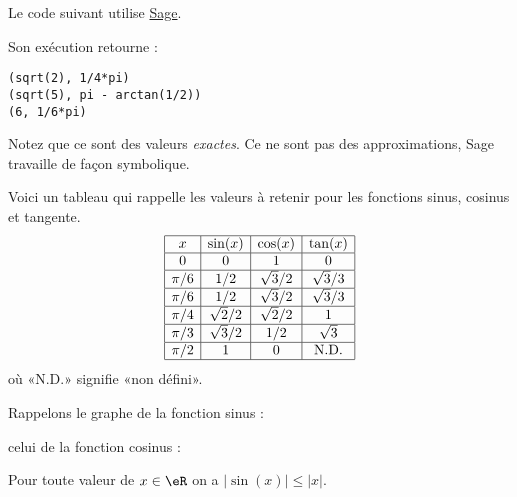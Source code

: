 Le code suivant utilise \href{http://www.sagemath.org}{Sage}.



Son exécution retourne :
\begin{verbatim}
(sqrt(2), 1/4*pi)
(sqrt(5), pi - arctan(1/2))
(6, 1/6*pi)
\end{verbatim}
Notez que ce sont des valeurs \emph{exactes}. Ce ne sont pas des approximations, Sage travaille de façon symbolique.

Voici un tableau qui rappelle les valeurs à retenir pour les fonctions sinus, cosinus et tangente.
\begin{equation}\label{PGooIMQFooTnBdIl}
    \begin{array}[]{|c|c|c|c|}
      \hline
      x&\sin(x)&\cos(x)&\tan(x)\\
      \hline
      0&0&1&0\\
      \hline
      \pi/6&1/2&\sqrt{3}/2&\sqrt{3}/3\\
      \hline
      \pi/6&1/2&\sqrt{3}/2&\sqrt{3}/3\\
      \hline
      \pi/4&\sqrt{2}/2&\sqrt{2}/2&1\\
      \hline
      \pi/3&\sqrt{3}/2&1/2&\sqrt{3}\\
      \hline
      \pi/2&1&0&\text{N.D.}\\
      \hline
    \end{array}
\end{equation}
où «N.D.»  signifie «non défini».

Rappelons le graphe de la fonction sinus :
\begin{center}
   
\end{center}
celui de la fonction cosinus :
\begin{center}
   
\end{center}


\begin{lemma}
  Pour toute valeur de $x\in \eR$ on a $|\sin(x)|\leq |x|$.
\end{lemma}

